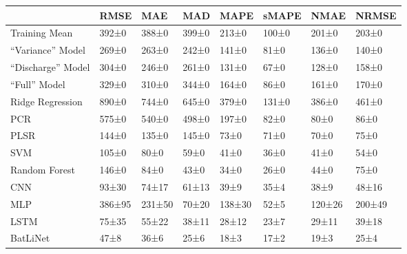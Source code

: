\begin{tabular}{llllllll}
\toprule
 & RMSE & MAE & MAD & MAPE & sMAPE & NMAE & NRMSE \\
\midrule
Training Mean & 392±0 & 388±0 & 399±0 & 213±0 & 100±0 & 201±0 & 203±0 \\
``Variance'' Model & 269±0 & 263±0 & 242±0 & 141±0 & 81±0 & 136±0 & 140±0 \\
``Discharge'' Model & 304±0 & 246±0 & 261±0 & 131±0 & 67±0 & 128±0 & 158±0 \\
``Full'' Model & 329±0 & 310±0 & 344±0 & 164±0 & 86±0 & 161±0 & 170±0 \\
Ridge Regression & 890±0 & 744±0 & 645±0 & 379±0 & 131±0 & 386±0 & 461±0 \\
PCR & 575±0 & 540±0 & 498±0 & 197±0 & 82±0 & 80±0 & 86±0 \\
PLSR & 144±0 & 135±0 & 145±0 & 73±0 & 71±0 & 70±0 & 75±0 \\
SVM & 105±0 & 80±0 & 59±0 & 41±0 & 36±0 & 41±0 & 54±0 \\
Random Forest & 146±0 & 84±0 & 43±0 & 34±0 & 26±0 & 44±0 & 75±0 \\
CNN & 93±30 & 74±17 & 61±13 & 39±9 & 35±4 & 38±9 & 48±16 \\
MLP & 386±95 & 231±50 & 70±20 & 138±30 & 52±5 & 120±26 & 200±49 \\
LSTM & 75±35 & 55±22 & 38±11 & 28±12 & 23±7 & 29±11 & 39±18 \\
BatLiNet & 47±8 & 36±6 & 25±6 & 18±3 & 17±2 & 19±3 & 25±4 \\
\bottomrule
\end{tabular}
